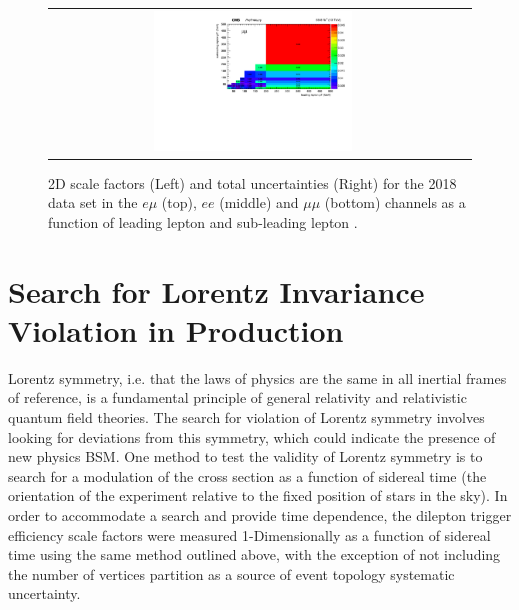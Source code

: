 \begin{figure}[h]
\begin{center}
\begin{tabular}{cc}
      \includegraphics[width=0.50\textwidth]{fig_2018_TrigSF/h2D_lepABpt_mumu_BinErrors.pdf}\\
    \end{tabular}
    \caption{2D scale factors (Left) and total uncertainties (Right) for the 2018 data set in the $e\mu$ (top), $ee$ (middle) and $\mu\mu$ (bottom) channels as a function of leading lepton \pT and sub-leading lepton \pT.}
    \label{TrigSF_2018_4}
  \end{center}
\end{figure}

\clearpage
\newpage
\section{Search for Lorentz Invariance Violation in \ttbar Production}
Lorentz symmetry, i.e. that the laws of physics are the same in all inertial frames of reference, is a fundamental principle of general relativity and relativistic quantum field theories.
The search for violation of Lorentz symmetry involves looking for deviations from this symmetry, which could indicate the presence of new physics BSM.
One method to test the validity of Lorentz symmetry is to search for a modulation of the \ttbar cross section as a function of sidereal time (the orientation of the experiment relative to the fixed position of stars in the sky).
In order to accommodate a search and provide time dependence, the dilepton trigger efficiency scale factors were measured 1-Dimensionally as a function of sidereal time using the same method outlined above, with the exception of not including the number of vertices partition as a source of event topology systematic uncertainty.
